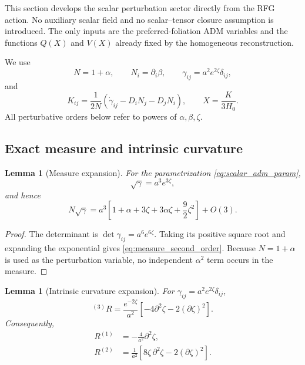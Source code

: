 \documentclass[11pt,a4paper]{article}
\newtheorem{lemma}[axiom]{Lemma}
\begin{document}
This section develops the scalar perturbation sector directly from the RFG
action.  No auxiliary scalar field and no scalar--tensor closure assumption is introduced.
The only inputs are the preferred-foliation ADM variables and the functions
\(Q(X)\) and \(V(X)\) already fixed by the homogeneous reconstruction.

We use
\begin{equation}
N=1+\alpha,\qquad
N_i=\partial_i\beta,\qquad
\gamma_{ij}=a^2 e^{2\zeta}\delta_{ij},
\label{eq:scalar_adm_param}
\end{equation}
and
\begin{equation}
K_{ij}=\frac{1}{2N}
\left(\dot\gamma_{ij}-D_iN_j-D_jN_i\right),
\qquad
X=\frac{K}{3H_0}.
\label{eq:scalar_K_definition}
\end{equation}
All perturbative orders below refer to powers of
\(\alpha,\beta,\zeta\).

\subsection{Exact measure and intrinsic curvature}

\begin{lemma}[Measure expansion]
For the parametrization \eqref{eq:scalar_adm_param},
\begin{equation}
\sqrt{\gamma}=a^3e^{3\zeta},
\end{equation}
and hence
\begin{equation}
N\sqrt{\gamma}
=
a^3\left[
1+\alpha+3\zeta+3\alpha\zeta+\frac{9}{2}\zeta^2
\right]+O(3).
\label{eq:measure_second_order}
\end{equation}
\end{lemma}

\begin{proof}
The determinant is
\(\det\gamma_{ij}=a^6e^{6\zeta}\).  Taking its positive square root and
expanding the exponential gives \eqref{eq:measure_second_order}.  Because
\(N=1+\alpha\) is used as the perturbation variable, no independent
\(\alpha^2\) term occurs in the measure.
\end{proof}

\begin{lemma}[Intrinsic curvature expansion]
For \(\gamma_{ij}=a^2e^{2\zeta}\delta_{ij}\),
\begin{equation}
{}^{(3)}R
=
\frac{e^{-2\zeta}}{a^2}
\left[-4\partial^2\zeta-2(\partial\zeta)^2\right].
\label{eq:exact_3curvature}
\end{equation}
Consequently,
\begin{align}
R^{(1)}&=-\frac{4}{a^2}\partial^2\zeta,
\\
R^{(2)}&=
\frac{1}{a^2}
\left[
8\zeta\,\partial^2\zeta-2(\partial\zeta)^2
\right].
\label{eq:3curvature_orders}
\end{align}
\end{lemma}
\end{document}
